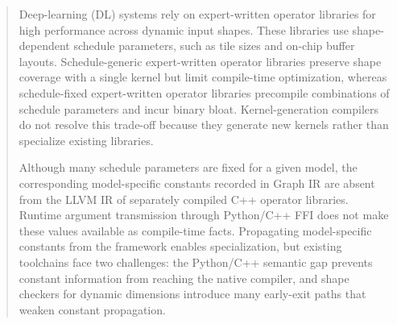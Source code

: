 \begin{abstract}
Deep-learning (DL) systems rely on expert-written operator libraries for high performance across dynamic input shapes. These libraries use shape-dependent schedule parameters, such as tile sizes and on-chip buffer layouts. Schedule-generic expert-written operator libraries preserve shape coverage with a single kernel but limit compile-time optimization, whereas schedule-fixed expert-written operator libraries precompile combinations of schedule parameters and incur binary bloat. Kernel-generation compilers do not resolve this trade-off because they generate new kernels rather than specialize existing libraries.


Although many schedule parameters are fixed for a given model, the corresponding model-specific constants recorded in Graph IR are absent from the LLVM IR of separately compiled C++ operator libraries. Runtime argument transmission through Python/C++ FFI does not make these values available as compile-time facts. Propagating model-specific constants from the framework enables specialization, but existing toolchains face two challenges: the Python/C++ semantic gap prevents constant information from reaching the native compiler, and shape checkers for dynamic dimensions introduce many early-exit paths that weaken constant propagation.


\end{abstract}
